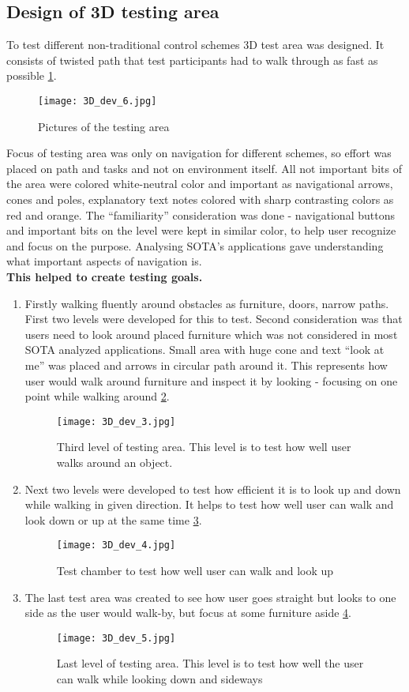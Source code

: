 \subsection{Design of 3D testing area}
To test different non-traditional control schemes 3D test area was designed. It consists of twisted path that test participants had to walk through as fast as possible \ref{TestLevels}.
\begin{figure}[H]
\centering
\texttt{[image: 3D\_dev\_6.jpg]}
\caption{Pictures of the testing area}
\label{TestLevels}
\end{figure}
Focus of testing area was only on navigation for different schemes, so effort was placed on path and tasks and not on environment itself. All not important bits of the area were colored white-neutral color and important as navigational arrows, cones and poles, explanatory text notes colored with sharp contrasting colors as red and orange. The “familiarity” consideration was done - navigational buttons and important bits on the level were kept in similar color, to help user recognize and focus on the purpose.
Analysing SOTA’s applications gave understanding what important aspects of navigation is.
\\
  \textbf{This helped to create testing goals.}
\begin {enumerate}
\item Firstly walking fluently around obstacles as furniture, doors, narrow paths. First two levels were developed for this to test. Second consideration was that users need to look around placed furniture which was not considered in most SOTA analyzed applications. Small area with huge cone and text “look at me” was placed and arrows in circular path around it. This represents how user would walk around furniture and inspect it by looking - focusing on one point while walking around \ref{TestLevel3}.
\begin{figure}[H]
\centering
\texttt{[image: 3D\_dev\_3.jpg]}
\caption{Third level of testing area. This level is to test how well user walks around an object.}
\label{TestLevel3}
\end{figure}
\item Next two levels were developed to test how efficient it is to look up and down while walking in given direction. It helps to test how well user can walk and look down or up at the same time \ref{TestLevel4}.
\begin{figure}[H]
\centering
\texttt{[image: 3D\_dev\_4.jpg]}
\caption{Test chamber to test how well user can walk and look up}
\label{TestLevel4}
\end{figure}
\item The last test area was created to see how user goes straight but looks to one side as the user would walk-by, but focus at some furniture aside \ref{TestLevel5}.
\begin{figure}[H]
\centering
\texttt{[image: 3D\_dev\_5.jpg]}
\caption{Last level of testing area. This level is to test how well the user can walk while looking down and sideways}
\label{TestLevel5}
\end{figure}
\end{enumerate} 

